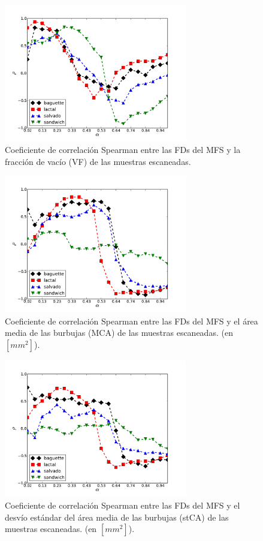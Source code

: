 \begin{figure}[h!]
\centering
\includegraphics[width=8cm]{VF}
\caption{Coeficiente de correlación Spearman entre las FDs del MFS y la fracción de vacío (VF) de las muestras escaneadas.}
\label{fig:corrVF}
\end{figure}

\begin{figure}[h!]
\centering
\includegraphics[width=8cm]{MCA}
\caption{Coeficiente de correlación Spearman entre las FDs del MFS y el área media de las burbujas (MCA) de las muestras escaneadas. (en $[mm^{2}]$).}
\label{fig:corrMCA}
\end{figure}

\begin{figure}[h!]
\centering
\includegraphics[width=8cm]{stMCA}
\caption{Coeficiente de correlación Spearman entre las FDs del MFS y el desvío estándar del área media de las burbujas (stCA) de las muestras escaneadas. (en $[mm^{2}]$).}
\label{fig:corrMCAstdev}
\end{figure}

